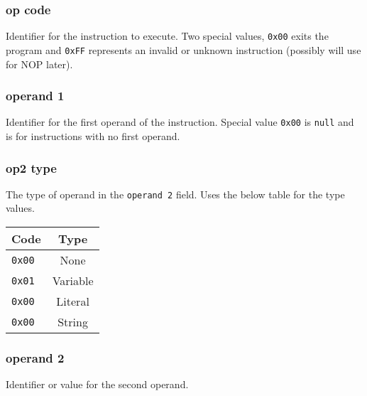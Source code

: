 \documentclass[landscape]{report}
\begin{document}
			\subsubsection*{op code}
			
			Identifier for the instruction to execute. Two special values, \verb|0x00| exits the program and \verb|0xFF| represents an invalid or unknown instruction (possibly will use for NOP later).
			
			\subsubsection*{operand 1}
			
			Identifier for the first operand of the instruction. Special value \verb|0x00| is \verb|null| and is for instructions with no first operand.
			
			\subsubsection*{op2 type}
			
			The type of operand in the \verb|operand 2| field. Uses the below table for the type values.
			
			\vspace{10pt}
			\begin{tabular}{|l|c|}
				\hline 
				\textbf{Code} & \textbf{Type} \\ 
				\hline 
				\verb|0x00| & None \\ 
				\hline 
				\verb|0x01| & Variable \\ 
				\hline 
				\verb|0x00| & Literal \\ 
				\hline 
				\verb|0x00| & String \\ 
				\hline 
			\end{tabular} 
			
			
			\subsubsection*{operand 2}
	
			Identifier or value for the second operand.
	
	
\end{document}
